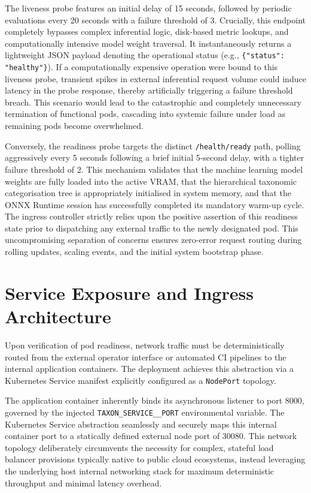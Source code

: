 The liveness probe features an initial delay of 15 seconds, followed by periodic evaluations every 20 seconds with a failure threshold of 3. Crucially, this endpoint completely bypasses complex inferential logic, disk-based metric lookups, and computationally intensive model weight traversal. It instantaneously returns a lightweight JSON payload denoting the operational status (e.g., \texttt{\{"status": "healthy"\}}). If a computationally expensive operation were bound to this liveness probe, transient spikes in external inferential request volume could induce latency in the probe response, thereby artificially triggering a failure threshold breach. This scenario would lead to the catastrophic and completely unnecessary termination of functional pods, cascading into systemic failure under load as remaining pods become overwhelmed.

Conversely, the readiness probe targets the distinct \texttt{/health/ready} path, polling aggressively every 5 seconds following a brief initial 5-second delay, with a tighter failure threshold of 2. This mechanism validates that the machine learning model weights are fully loaded into the active VRAM, that the hierarchical taxonomic categorisation tree is appropriately initialised in system memory, and that the ONNX Runtime session has successfully completed its mandatory warm-up cycle. The ingress controller strictly relies upon the positive assertion of this readiness state prior to dispatching any external traffic to the newly designated pod. This uncompromising separation of concerns ensures zero-error request routing during rolling updates, scaling events, and the initial system bootstrap phase.

\section{Service Exposure and Ingress Architecture}
\label{sec:service_exposure_ingress}

Upon verification of pod readiness, network traffic must be deterministically routed from the external operator interface or automated CI pipelines to the internal application containers. The deployment achieves this abstraction via a Kubernetes Service manifest explicitly configured as a \texttt{NodePort} topology.

The application container inherently binds its asynchronous listener to port 8000, governed by the injected \texttt{TAXON\_SERVICE\_\_PORT} environmental variable. The Kubernetes Service abstraction seamlessly and securely maps this internal container port to a statically defined external node port of 30080. This network topology deliberately circumvents the necessity for complex, stateful load balancer provisions typically native to public cloud ecosystems, instead leveraging the underlying host internal networking stack for maximum deterministic throughput and minimal latency overhead.

